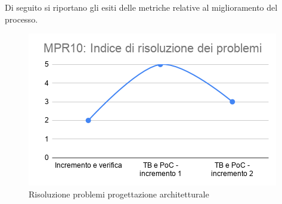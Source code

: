 Di seguito si riportano gli esiti delle metriche relative al miglioramento del processo.
\begin{figure}[h!]
	\centering
	\includegraphics[scale=0.6]{Immagini/MPR10_rproblemi.png}
	\caption{Risoluzione problemi progettazione architetturale}
	\label{fig:MPR10}
\end{figure}